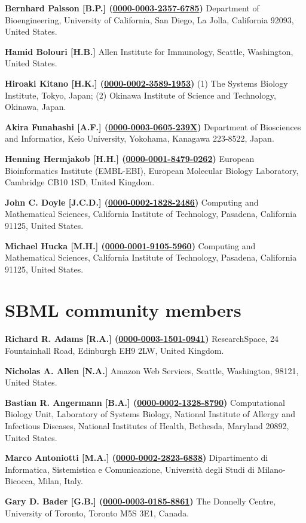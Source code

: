 \documentclass{sbml-paper}
\newcommand{\orcid}[1]{\href{https://orcid.org/#1}{#1}}
\begin{document}
\textbf{Bernhard Palsson [B.P.] (\orcid{0000-0003-2357-6785})} Department of Bioengineering, University of California, San Diego, La Jolla, California 92093, United States.

\textbf{Hamid Bolouri [H.B.]} Allen Institute for Immunology, Seattle, Washington, United States.

\textbf{Hiroaki Kitano [H.K.] (\orcid{0000-0002-3589-1953})} (1) The Systems Biology Institute, Tokyo, Japan; (2) Okinawa Institute of Science and Technology, Okinawa, Japan.

\textbf{Akira Funahashi [A.F.] (\orcid{0000-0003-0605-239X})} Department of Biosciences and Informatics, Keio University, Yokohama, Kanagawa 223-8522, Japan.

\textbf{Henning Hermjakob [H.H.] (\orcid{0000-0001-8479-0262})} European Bioinformatics Institute (EMBL-EBI), European Molecular Biology Laboratory, Cambridge CB10 1SD, United Kingdom.

\textbf{John C. Doyle [J.C.D.] (\orcid{0000-0002-1828-2486})} Computing and Mathematical Sciences, California Institute of Technology, Pasadena, California 91125, United States.

\textbf{Michael Hucka [M.H.] (\orcid{0000-0001-9105-5960})} Computing and Mathematical Sciences, California Institute of Technology, Pasadena, California 91125, United States.


\clearpage
\section{SBML community members}

\textbf{Richard R. Adams [R.A.] (\orcid{0000-0003-1501-0941})} ResearchSpace, 24 Fountainhall Road, Edinburgh EH9 2LW, United Kingdom.

\textbf{Nicholas A. Allen [N.A.]} Amazon Web Services, Seattle, Washington, 98121, United States.

\textbf{Bastian R. Angermann [B.A.] (\orcid{0000-0002-1328-8790})} Computational Biology Unit, Laboratory of Systems Biology, National Institute of Allergy and Infectious Diseases, National Institutes of Health, Bethesda, Maryland 20892, United States.

\textbf{Marco Antoniotti [M.A.] (\orcid{0000-0002-2823-6838})} Dipartimento di Informatica, Sistemistica e Comunicazione, Università degli Studi di Milano-Bicocca, Milan, Italy.

\textbf{Gary D. Bader [G.B.] (\orcid{0000-0003-0185-8861})} The Donnelly Centre, University of Toronto, Toronto M5S 3E1, Canada.
\end{document}

